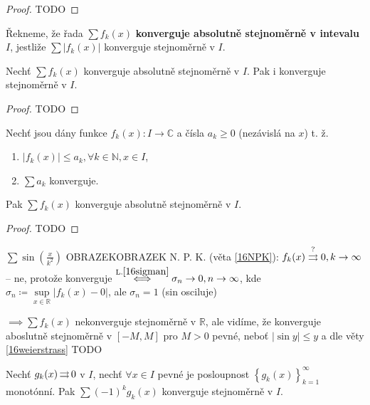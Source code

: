 \begin{proof}
    TODO
\end{proof}

\begin{definice}
    Řekneme, že řada $\sum f_k(x)$ \textbf{konverguje absolutně stejnoměrně v intevalu} $I$, jestliže $\sum|f_k(x)|$ konverguje stejnoměrně v $I$.
\end{definice}

\begin{veta}\label{16npk}
    Nechť $\sum f_k(x)$ konverguje absolutně stejnoměrně v $I$. Pak i konverguje stejnoměrně v $I$.
\end{veta}

\begin{proof}
    TODO
\end{proof}

\begin{veta}[Weierstrassova]\label{16weierstrass}
    Nechť jsou dány funkce $f_k(x)\colon I \to \mathbb C$ a čísla $a_k\geq 0$ (nezávislá na $x$) t. ž.
    \begin{enumerate}[1.]
        \item $|f_k(x)|\leq a_k, \forall k \in \mathbb N, x \in I$,
        \item $\sum a_k$ konverguje.
    \end{enumerate}
    Pak $\sum f_k(x)$ konverguje absolutně stejnoměrně v $I$.
\end{veta}

\begin{proof}
    TODO
\end{proof}

\begin{priklad}
    $\sum \sin \left(\frac{x}{k^2}\right)$
    OBRAZEKOBRAZEK
    N. P. K. (věta \ref{16NPK}): $f_k(x)\stackrel{?}{\operatorname{\rightrightarrows}}0, k \to \infty$ -- ne, protože konverguje $\stackrel{\text{L.}\ref{16sigman}}{\iff} \sigma_n \to 0, n \to \infty$, kde $\sigma_n\coloneq \sup\limits_{x\in \mathbb R}|f_k(x)-0|$, ale $\sigma_n = 1$ (sin osciluje)

    $\implies\sum f_k(x)$ nekonverguje stejnoměrně v $\mathbb R$, ale vidíme, že konverguje aboslutně stejnoměrně v $[-M, M]$ pro $M>0$ pevné, neboť $|\sin y|\leq y$ a dle věty \ref{16weierstrass} TODO
\end{priklad}

\begin{veta}
    Nechť $g_k(x) \operatorname{\rightrightarrows} 0$ v $I$, nechť $\forall x \in  I$ pevné je posloupnost $\left\{g_k(x)\right\}_{k=1}^\infty$ monotónní. Pak $\sum (-1)^k g_k(x)$ konverguje stejnoměrně v $I$.
\end{veta}

